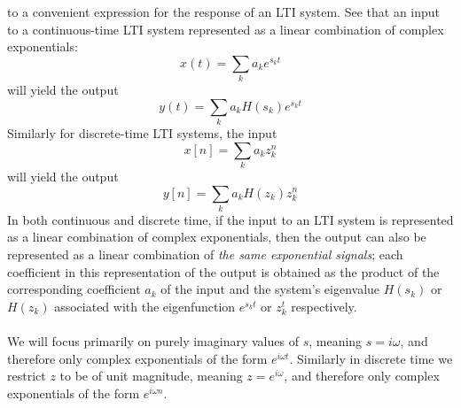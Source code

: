 \documentclass{report}
\begin{document}
to a convenient expression for the response of an LTI system. See that an input to a continuous-time LTI system represented as a linear combination of complex exponentials:
\begin{equation*}
x(t)=\sum_ka_ke^{s_kt}
\end{equation*}
will yield the output
\begin{equation*}
y(t)=\sum_ka_kH(s_k)e^{s_kt}
\end{equation*}
Similarly for discrete-time LTI systems, the input
\begin{equation*}
x[n]=\sum_ka_kz^n_k
\end{equation*}
will yield the output
\begin{equation*}
y[n]=\sum_ka_kH(z_k)z^n_k
\end{equation*}
In both continuous and discrete time, if the input to an LTI system is represented as a linear combination of complex exponentials, then the output can also be represented as a linear
combination of \textit{the same exponential signals}; each coefficient in this representation of the output is obtained as the product of the corresponding coefficient $a_k$ of the input and the system's
eigenvalue $H(s_k)$ or $H(z_k)$ associated with the eigenfunction $e^{s_kt}$ or $z_k^t$ respectively.\\
\vspace{1mm}\\
We will focus primarily on purely imaginary values of $s$, meaning $s=i\omega$, and therefore only complex exponentials of the form $e^{i\omega t}$. Similarly
in discrete time we restrict $z$ to be of unit magnitude, meaning $z=e^{i\omega}$, and therefore only complex exponentials of the form $e^{i\omega n}$.
\newpage
\end{document}
